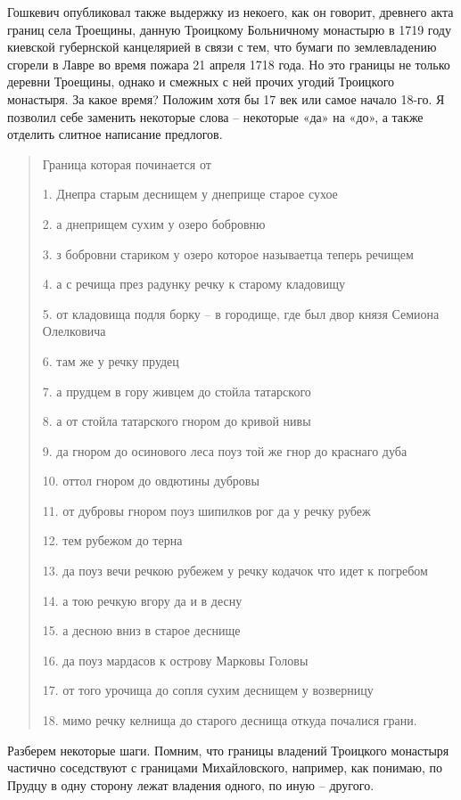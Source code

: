 Гошкевич опубликовал также выдержку из некоего, как он говорит, древнего акта границ села Троещины, данную Троицкому Больничному монастырю в 1719 году киевской губернской канцелярией в связи с тем, что бумаги по землевладению сгорели в Лавре во время пожара 21 апреля 1718 года. Но это границы не только деревни Троещины, однако и смежных с ней прочих угодий Троицкого монастыря. За какое время? Положим хотя бы 17 век или самое начало 18-го. Я позволил себе заменить некоторые слова – некоторые «да» на «до», а также отделить слитное написание предлогов.

\begin{quotation}
Граница которая починается от 

1. Днепра старым деснищем у днеприще старое сухое

2. а днеприщем сухим у озеро бобровню 

3. з бобровни стариком у озеро которое называетца теперь речищем 

4. а с речища през радунку речку к старому кладовищу 

5. от кладовища подля борку – в городище, где был двор князя Семиона Олелковича

6. там же у речку прудец

7. а прудцем в гору живцем до стойла татарского

8. а от стойла татарского гнором до кривой нивы

9. да гнором до осинового леса поуз той же гнор до краснаго дуба

10. оттол гнором до овдютины дубровы

11. от дубровы гнором поуз шипилков рог да у речку рубеж

12. тем рубежом до терна

13. да поуз вечи речкою рубежем у речку кодачок что идет к погребом

14. а тою речкую вгору да и в десну

15. а десною вниз в старое деснище

16. да поуз мардасов к острову Марковы Головы

17. от того урочища до сопля сухим деснищем у возверницу 

18. мимо речку келнища до старого деснища откуда почалися грани.
\end{quotation}

Разберем некоторые шаги. Помним, что границы владений Троицкого монастыря частично соседствуют с границами Михайловского, например, как понимаю, по Прудцу в одну сторону лежат владения одного, по иную – другого.

